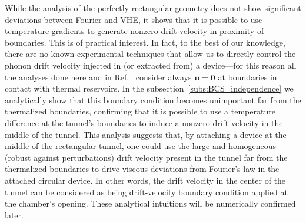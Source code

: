 \documentclass[
prb,
twocolumn,
superscriptaddress,
 amsmath,amssymb,
 aps,
longbibliography,
]{revtex4-2}
\begin{document}
While the analysis of the perfectly rectangular geometry does not show significant deviations between Fourier and VHE, it shows that it is possible to use temperature gradients to generate nonzero drift velocity in proximity of boundaries. This is of practical interest. In fact, to the best of our knowledge, there are no known experimental techniques that allow us to directly control the phonon drift velocity injected in (or extracted from) a device---for this reason all the analyses done here and in Ref.~\cite{Simoncelli2020} consider always $\bm{u}{=}\bm{0}$ at boundaries in contact with thermal reservoirs.
In the subsection~\ref{subs:BCS_independence} we analytically show that this boundary condition becomes unimportant far from the thermalized boundaries, confirming that it is possible to use a temperature difference at the tunnel's boundaries to induce a nonzero drift velocity in the middle of the tunnel.
This analysis suggests that, by attaching a device at the middle of the rectangular tunnel, one could use the large and homogeneous (robust against perturbations) drift velocity present in the tunnel far from the thermalized boundaries to drive viscous deviations from Fourier's law in the attached circular device. In other words, the drift velocity in the center of the tunnel can be considered as being drift-velocity boundary condition applied at the chamber's opening. These analytical intuitions will be numerically confirmed later.
\end{document}
